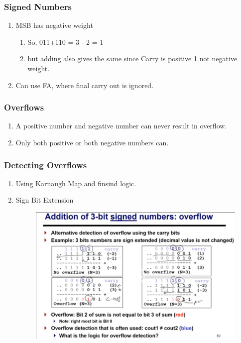 \documentclass[11pt, a4paper]{article}
\begin{document}
\subsubsection{Signed Numbers}
\begin{enumerate}
    \item MSB has negative weight
    \begin{enumerate}
        \item So, 011+110 = 3 - 2 = 1
        \item but adding also gives the same since Carry is positive 1 not negative weight.
    \end{enumerate}
    \item Can use FA, where final carry out is ignored.
\end{enumerate}
\subsubsection{Overflows}
\begin{enumerate}
    \item A positive number and negative number can never result in overflow.
    \item Only both positive or both negative numbers can.
\end{enumerate}
\subsubsection{Detecting Overflows}
\begin{enumerate}
    \item Using Karnaugh Map and finsind logic.
    \item Sign Bit Extension
    \begin{figure}[H]
        \centering
        \includegraphics[width = \textwidth]{Module 5/Notes/Pictures/Overflow Detection.png}
    \end{figure}
\end{enumerate}
\end{document}
